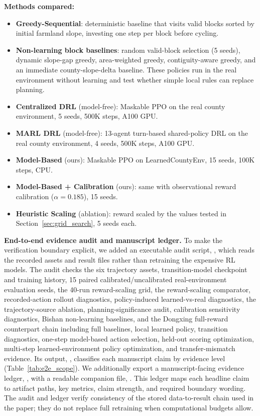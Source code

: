 \documentclass[11pt]{article}
\begin{document}
\textbf{Methods compared:}
\begin{itemize}
\item \textbf{Greedy-Sequential}: deterministic baseline that visits valid blocks sorted by initial farmland slope, investing one step per block before cycling.
\item \textbf{Non-learning block baselines}: random valid-block selection (5 seeds), dynamic slope-gap greedy, area-weighted greedy, contiguity-aware greedy, and an immediate county-slope-delta baseline. These policies run in the real environment without learning and test whether simple local rules can replace planning.
\item \textbf{Centralized DRL} (model-free): Maskable PPO on the real county environment, 5 seeds, 500K steps, A100 GPU.
\item \textbf{MARL DRL} (model-free): 13-agent turn-based shared-policy DRL on the real county environment, 4 seeds, 500K steps, A100 GPU.
\item \textbf{Model-Based} (ours): Maskable PPO on LearnedCountyEnv, 15 seeds, 100K steps, CPU.
\item \textbf{Model-Based + Calibration} (ours): same with observational reward calibration ($\alpha = 0.185$), 15 seeds.
\item \textbf{Heuristic Scaling} (ablation): reward scaled by the values tested in Section~\ref{sec:grid_search}, 5 seeds each.
\end{itemize}

\textbf{End-to-end evidence audit and manuscript ledger.} To make the verification boundary explicit, we added an executable audit script, , which reads the recorded assets and result files rather than retraining the expensive RL models. The audit checks the six trajectory assets, transition-model checkpoint and training history, 15 paired calibrated/uncalibrated real-environment evaluation seeds, the 40-run reward-scaling grid, the reward-scaling comparator, recorded-action rollout diagnostics, policy-induced learned-vs-real diagnostics, the trajectory-source ablation, planning-significance audit, calibration sensitivity diagnostics, Bishan non-learning baselines, and the Dongxing full-reward counterpart chain including full baselines, local learned policy, transition diagnostics, one-step model-based action selection, held-out scoring optimization, multi-step learned-environment policy optimization, and transfer-mismatch evidence. Its output, , classifies each manuscript claim by evidence level (Table~\ref{tab:e2e_scope}). We additionally export a manuscript-facing evidence ledger, , with a readable companion file, . This ledger maps each headline claim to artifact paths, key metrics, claim strength, and required boundary wording. The audit and ledger verify consistency of the stored data-to-result chain used in the paper; they do not replace full retraining when computational budgets allow.
\end{document}

